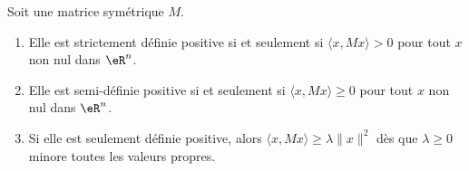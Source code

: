 \begin{lemma}   \label{LemWZFSooYvksjw}
    Soit une matrice symétrique \( M\).
    \begin{enumerate}
        \item       \label{ITEMooSKRAooOgHbGA}
           Elle est strictement définie positive si et seulement si \( \langle x, Mx\rangle >0\) pour tout \( x\) non nul dans \( \eR^n\).
        \item       \label{ITEMooMOZYooWcrewZ}
           Elle est semi-définie positive si et seulement si \( \langle x, Mx\rangle \geq 0\) pour tout \( x\) non nul dans \( \eR^n\).
       \item        \label{ITEMooRRMFooHSOHxZ}
           Si elle est seulement définie positive, alors \( \langle x, Mx\rangle \geq \lambda\| x \|^2\) dès que \( \lambda\geq 0\) minore toutes les valeurs propres.
    \end{enumerate}
\end{lemma}


